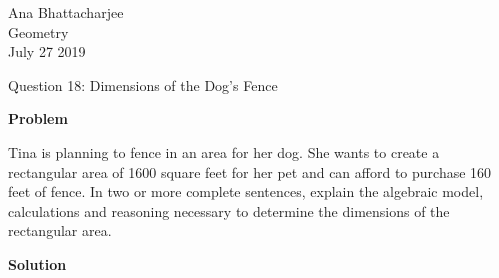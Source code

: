 \documentclass[12pt]{article}
\begin{document}
\begin{flushleft}

Ana Bhattacharjee\\
Geometry\\
July 27 2019\\


\begin{center}
Question 18: Dimensions of the Dog's Fence
\end{center}


\setlength{\parindent}{0.5in}
\begin{flushleft}
  \textbf{Problem}
\end{flushleft}

Tina is planning to fence in an area for her dog. She wants to create a rectangular area of 1600 square feet for her pet and can afford to purchase 160 feet of fence. In two or more complete sentences, explain the algebraic model, calculations and reasoning necessary to determine the dimensions of the rectangular area.

\par

\begin{flushleft}
  \textbf{Solution}
\end{flushleft}


\end{flushleft}
\end{document}
